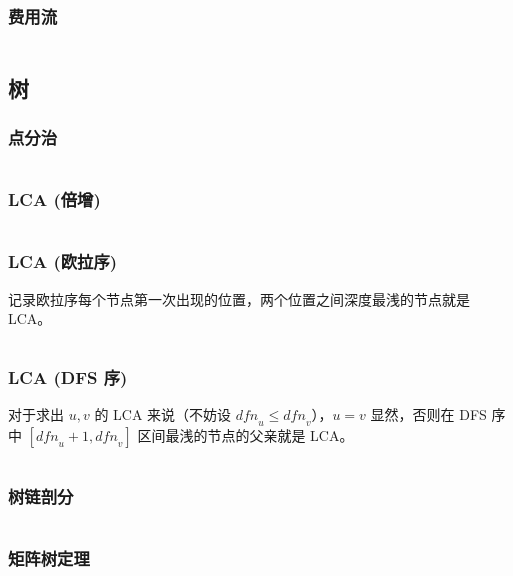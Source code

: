 \documentclass{article}
\begin{document}
\subsubsection{费用流} %
\inputminted[breaklines, frame=single]{c++}{../algo/图论/网络流/最小费用最大流.cpp}


\subsection{树}

\subsubsection{点分治} %
\inputminted[breaklines, frame=single]{c++}{../algo/图论/树/点分治.cpp}


\subsubsection{LCA (倍增)} %
\inputminted[breaklines, frame=single]{c++}{../algo/图论/树/LCA【倍增】.cpp}


\subsubsection{LCA (欧拉序)} %
记录欧拉序每个节点第一次出现的位置，两个位置之间深度最浅的节点就是 LCA。
\inputminted[breaklines, frame=single]{c++}{../algo/图论/树/LCA【欧拉序】.cpp}


\subsubsection{LCA (DFS 序)} %
对于求出 $u,v$ 的 LCA 来说（不妨设 $\textit{dfn}_u\le \textit{dfn}_v$），$u=v$ 显然，否则在 DFS 序中 $[\textit{dfn}_u+1,\textit{dfn}_v]$ 区间最浅的节点的父亲就是 LCA。
\inputminted[breaklines, frame=single]{c++}{../algo/图论/树/LCA【dfs序】.cpp}



\subsubsection{树链剖分} %
\inputminted[breaklines, frame=single]{c++}{../algo/图论/树/树链剖分【非封装版】.cpp}


\subsubsection{矩阵树定理} %
\end{document}
